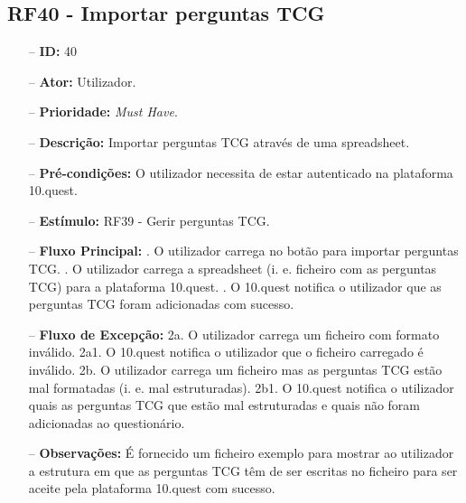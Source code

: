 \subsection{RF40 - Importar perguntas TCG}
\begin{itemize}
	\item[--] \textbf{ID:} 40
	\item[--]  \textbf{Ator:} Utilizador.
	\item[--]  \textbf{Prioridade:} \textit{Must Have}.
	\item[--]  \textbf{Descrição:} Importar perguntas TCG através de uma spreadsheet. 
	\item[--]  \textbf{Pré-condições:} O utilizador necessita de estar autenticado na plataforma 10.quest.
	\item[--]  \textbf{Estímulo:}  RF39 - Gerir perguntas TCG.
	\item[--]  \textbf{Fluxo Principal:} 
		. O utilizador carrega no botão para importar perguntas TCG.
		. O utilizador carrega a spreadsheet (i. e. ficheiro com as perguntas TCG) para a plataforma 10.quest.
		. O 10.quest notifica o utilizador que as perguntas TCG foram adicionadas com sucesso.
	\item[--]  \textbf{Fluxo de Excepção:} 
		\subitem 2a. O utilizador carrega um ficheiro com formato inválido.
		\subitem 2a1. O 10.quest notifica o utilizador que o ficheiro carregado é inválido.
		\subitem 2b. O utilizador carrega um ficheiro mas as perguntas TCG estão mal formatadas (i. e. mal estruturadas).
		\subitem 2b1. O 10.quest notifica o utilizador quais as perguntas TCG que estão mal estruturadas e quais não foram adicionadas ao questionário.
		\begin{comment}
		\subitem 3a. O 10.quest não consegue efetuar o pedido à API do TCG devido a uma falha na conexão.
		\subitem 3a1. O 10.quest notifica o utilizador que ocorreu uma falha na conexão.
		\subitem 3b. O serviço do TCG (API) está indisponível.
		\subitem 3b1. O 10.quest notifica o utilizador que o serviço do TCG está temporariamente indisponível. 
		\end{comment}
	\item[--]  \textbf{Observações:} É fornecido um ficheiro exemplo para mostrar ao utilizador a estrutura em que as perguntas TCG  têm de ser escritas no ficheiro para ser aceite pela plataforma 10.quest com sucesso.
\end{itemize}
\newpage

